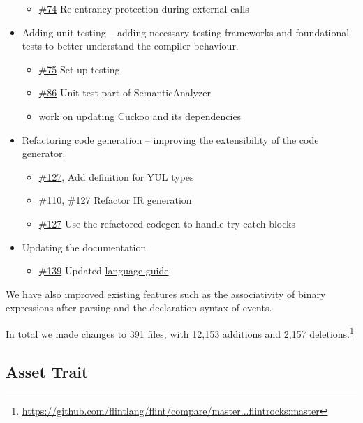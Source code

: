\begin{itemize}
\begin{itemize}
		\item \href{https://github.com/flintrocks/flint/pull/74}{\#74} Re-entrancy protection during external calls
	\end{itemize}
	\item Adding unit testing – adding necessary testing frameworks and foundational tests to better understand the compiler behaviour.
	\begin{itemize}
		\item \href{https://github.com/flintrocks/flint/pull/75}{\#75} Set up testing
		\item \href{https://github.com/flintrocks/flint/pull/86}{\#86} Unit test part of SemanticAnalyzer
		\item work on updating Cuckoo and its dependencies
	\end{itemize}
	\item Refactoring code generation – improving the extensibility of the code generator.
	\begin{itemize}
		\item \href{https://github.com/flintrocks/flint/pull/127}{\#127}, Add definition for YUL types
		\item \href{https://github.com/flintrocks/flint/pull/110}{\#110}, \href{https://github.com/flintrocks/flint/pull/127}{\#127} Refactor IR generation
		\item \href{https://github.com/flintrocks/flint/pull/127}{\#127} Use the refactored codegen to handle try-catch blocks
	\end{itemize}
	\item Updating the documentation
	\begin{itemize}
		\item \href{https://github.com/flintrocks/flint/pull/139}{\#139} Updated \hyperref[chp:appendix-b]{language guide}
	\end{itemize}
\end{itemize}

We have also improved existing features such as the associativity of binary expressions after parsing and the declaration syntax of events.

In total we made changes to 391 files, with 12,153 additions and 2,157 deletions.\footnote{\url{https://github.com/flintlang/flint/compare/master...flintrocks:master}}

\subsection{Asset Trait}

